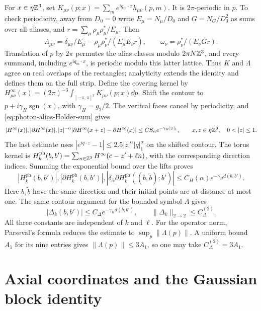 For $x\in\eta\mathbb Z^3$, set
$K_{\mu\nu}(p;x)=\sum_me^{iq_m\cdot x}h_{\mu\nu}(p,m)$.
It is $2\pi$-periodic in $p$. To check periodicity, away from $D_0=0$
write $E_\mu=N_\mu/D_0$ and $G=N_G/D_0^2$ as sums over all aliases,
and $r=\sum_\mu\rho_\mu\rho_\mu^*/E_\mu$. Then
\[
 \Lambda_{\mu\nu}=\delta_{\mu\nu}/E_\mu
                  -\rho_\mu\rho_\nu^*/(E_\mu E_\nu r),\qquad
 \omega_\nu=\rho_\nu^*/(E_\nu Gr).
\]
Translation of $p$ by $2\pi$ permutes the alias classes modulo
$2\pi N\mathbb Z^3$, and every summand, including $e^{iq_m\cdot x}$,
is periodic modulo this latter lattice. Thus $K$ and $\Lambda$
agree on real overlaps of the rectangles; analyticity extends the
identity and defines them on the full strip. Define the covering
kernel by
$H_{\mu\nu}^\infty(x)=(2\pi)^{-3}\int_{[-\pi,\pi]^3}K_{\mu\nu}(p;x)\dd p$.
Shift the contour to $p+i\gamma_H\operatorname{sgn}(x)$, with
$\gamma_H=g_2/2$. The vertical faces cancel by periodicity, and
\eqref{eq:photon-alias-Holder-sum} gives
\[
 |H^\infty(x)|, |\partial H^\infty(x)|,
 |z|^{-\alpha}|\partial H^\infty(x+z)-\partial H^\infty(x)|
          \le C S_\alpha e^{-\gamma_H|x|_1},
 \qquad x,z\in\eta\Z^3,\quad0<|z|\le1.
\]
The last estimate uses
$|e^{iq\cdot z}-1|\le2.5|z|^\alpha|q|_1^\alpha$ on the shifted
contour. The torus kernel is
$H_k^{\mathrm{ph}}(b,b')=\sum_{n\in\mathbb Z^3}H^\infty(c-z'+\ell n)$,
with the corresponding direction indices. Summing the exponential
bound over the lifts proves
\begin{equation}\label{eq:photon-kernel-regularity}
 |H_k^{\mathrm{ph}}(b,b')|, |\partial H_k^{\mathrm{ph}}(b,b')|,
 |\delta_\alpha\partial H_k^{\mathrm{ph}}((b,\tilde b);b')|
                 \le C_H(\alpha)e^{-\gamma_Hd(b,b')}.
\end{equation}
Here $b,\tilde b$ have the same direction and their initial points
are at distance at most one. The same contour argument for the bounded
symbol $\Lambda$ gives
\begin{equation}\label{eq:photon-form-kernel-decay}
 |\Delta_k(b,b')|\le C_\Delta e^{-\gamma_Hd(b,b')},\qquad
 \|\Delta_k\|_{2\to2}\le C_\Delta^{(2)}.
\end{equation}
All three constants are independent of $k$ and $\ell$.
For the operator norm, Parseval's formula reduces the estimate to
$\sup_p\|\Lambda(p)\|$. A uniform bound $A_1$ for its nine entries
gives $\|\Lambda(p)\|\le3A_1$, so one may take
$C_\Delta^{(2)}=3A_1$.

\section{Axial coordinates and the Gaussian block identity}\label{sec:axial}
